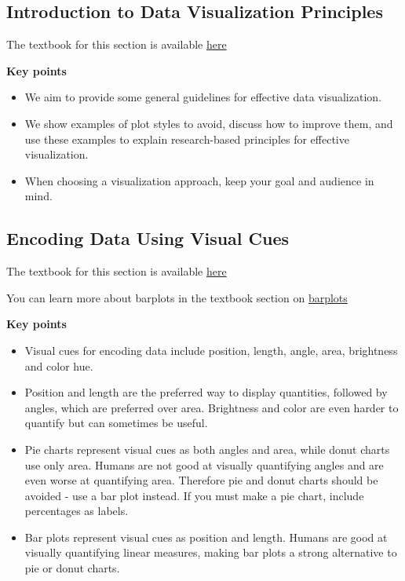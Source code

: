 \documentclass[
]{article}
\providecommand{\tightlist}{%
  \setlength{\itemsep}{0pt}\setlength{\parskip}{0pt}}
\begin{document}
\hypertarget{introduction-to-data-visualization-principles}{%
\subsection{Introduction to Data Visualization
Principles}\label{introduction-to-data-visualization-principles}}

The textbook for this section is available
\href{https://rafalab.github.io/dsbook/data-visualization-principles.html}{here}

\textbf{Key points}

\begin{itemize}
\tightlist
\item
  We aim to provide some general guidelines for effective data
  visualization.
\item
  We show examples of plot styles to avoid, discuss how to improve them,
  and use these examples to explain research-based principles for
  effective visualization.
\item
  When choosing a visualization approach, keep your goal and audience in
  mind.
\end{itemize}

\hypertarget{encoding-data-using-visual-cues}{%
\subsection{Encoding Data Using Visual
Cues}\label{encoding-data-using-visual-cues}}

The textbook for this section is available
\href{https://rafalab.github.io/dsbook/data-visualization-principles.html\#encoding-data-using-visual-cues}{here}

You can learn more about barplots in the textbook section on
\href{https://rafalab.github.io/dsbook/distributions.html\#barplots}{barplots}

\textbf{Key points}

\begin{itemize}
\tightlist
\item
  Visual cues for encoding data include position, length, angle, area,
  brightness and color hue.
\item
  Position and length are the preferred way to display quantities,
  followed by angles, which are preferred over area. Brightness and
  color are even harder to quantify but can sometimes be useful.
\item
  Pie charts represent visual cues as both angles and area, while donut
  charts use only area. Humans are not good at visually quantifying
  angles and are even worse at quantifying area. Therefore pie and donut
  charts should be avoided - use a bar plot instead. If you must make a
  pie chart, include percentages as labels.
\item
  Bar plots represent visual cues as position and length. Humans are
  good at visually quantifying linear measures, making bar plots a
  strong alternative to pie or donut charts.
\end{itemize}
\end{document}

